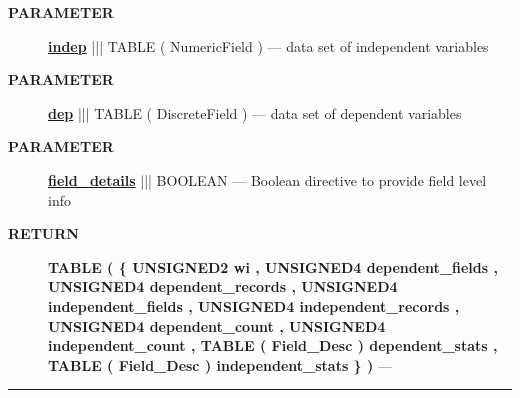\par
\begin{description}
\item [\colorbox{tagtype}{\color{white} \textbf{\textsf{PARAMETER}}}] \textbf{\underline{indep}} ||| TABLE ( NumericField ) --- data set of independent variables
\item [\colorbox{tagtype}{\color{white} \textbf{\textsf{PARAMETER}}}] \textbf{\underline{dep}} ||| TABLE ( DiscreteField ) --- data set of dependent variables
\item [\colorbox{tagtype}{\color{white} \textbf{\textsf{PARAMETER}}}] \textbf{\underline{field\_details}} ||| BOOLEAN --- Boolean directive to provide field level info
\end{description}







\par
\begin{description}
\item [\colorbox{tagtype}{\color{white} \textbf{\textsf{RETURN}}}] \textbf{TABLE ( \{ UNSIGNED2 wi , UNSIGNED4 dependent\_fields , UNSIGNED4 dependent\_records , UNSIGNED4 independent\_fields , UNSIGNED4 independent\_records , UNSIGNED4 dependent\_count , UNSIGNED4 independent\_count , TABLE ( Field\_Desc ) dependent\_stats , TABLE ( Field\_Desc ) independent\_stats \} )} --- 
\end{description}




\rule{\linewidth}{0.5pt}
